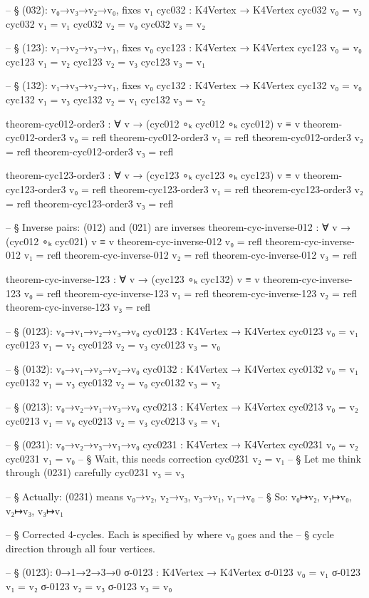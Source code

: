 \documentclass[11pt,a4paper]{book}
\begin{document}
\begin{code}
-- § (032): v₀→v₃→v₂→v₀, fixes v₁
cyc032 : K4Vertex → K4Vertex
cyc032 v₀ = v₃
cyc032 v₁ = v₁
cyc032 v₂ = v₀
cyc032 v₃ = v₂

-- § (123): v₁→v₂→v₃→v₁, fixes v₀
cyc123 : K4Vertex → K4Vertex
cyc123 v₀ = v₀
cyc123 v₁ = v₂
cyc123 v₂ = v₃
cyc123 v₃ = v₁

-- § (132): v₁→v₃→v₂→v₁, fixes v₀
cyc132 : K4Vertex → K4Vertex
cyc132 v₀ = v₀
cyc132 v₁ = v₃
cyc132 v₂ = v₁
cyc132 v₃ = v₂

theorem-cyc012-order3 : ∀ v → (cyc012 ∘ₖ cyc012 ∘ₖ cyc012) v ≡ v
theorem-cyc012-order3 v₀ = refl
theorem-cyc012-order3 v₁ = refl
theorem-cyc012-order3 v₂ = refl
theorem-cyc012-order3 v₃ = refl

theorem-cyc123-order3 : ∀ v → (cyc123 ∘ₖ cyc123 ∘ₖ cyc123) v ≡ v
theorem-cyc123-order3 v₀ = refl
theorem-cyc123-order3 v₁ = refl
theorem-cyc123-order3 v₂ = refl
theorem-cyc123-order3 v₃ = refl

-- § Inverse pairs: (012) and (021) are inverses
theorem-cyc-inverse-012 : ∀ v → (cyc012 ∘ₖ cyc021) v ≡ v
theorem-cyc-inverse-012 v₀ = refl
theorem-cyc-inverse-012 v₁ = refl
theorem-cyc-inverse-012 v₂ = refl
theorem-cyc-inverse-012 v₃ = refl

theorem-cyc-inverse-123 : ∀ v → (cyc123 ∘ₖ cyc132) v ≡ v
theorem-cyc-inverse-123 v₀ = refl
theorem-cyc-inverse-123 v₁ = refl
theorem-cyc-inverse-123 v₂ = refl
theorem-cyc-inverse-123 v₃ = refl

-- § (0123): v₀→v₁→v₂→v₃→v₀
cyc0123 : K4Vertex → K4Vertex
cyc0123 v₀ = v₁
cyc0123 v₁ = v₂
cyc0123 v₂ = v₃
cyc0123 v₃ = v₀

-- § (0132): v₀→v₁→v₃→v₂→v₀
cyc0132 : K4Vertex → K4Vertex
cyc0132 v₀ = v₁
cyc0132 v₁ = v₃
cyc0132 v₂ = v₀
cyc0132 v₃ = v₂

-- § (0213): v₀→v₂→v₁→v₃→v₀
cyc0213 : K4Vertex → K4Vertex
cyc0213 v₀ = v₂
cyc0213 v₁ = v₀
cyc0213 v₂ = v₃
cyc0213 v₃ = v₁

-- § (0231): v₀→v₂→v₃→v₁→v₀
cyc0231 : K4Vertex → K4Vertex
cyc0231 v₀ = v₂
cyc0231 v₁ = v₀
-- § Wait, this needs correction
cyc0231 v₂ = v₁
-- § Let me think through (0231) carefully
cyc0231 v₃ = v₃

-- § Actually: (0231) means v₀→v₂, v₂→v₃, v₃→v₁, v₁→v₀
-- § So: v₀↦v₂, v₁↦v₀, v₂↦v₃, v₃↦v₁

-- § Corrected 4-cycles. Each is specified by where v₀ goes and the 
-- § cycle direction through all four vertices.

-- § (0123): 0→1→2→3→0
σ-0123 : K4Vertex → K4Vertex
σ-0123 v₀ = v₁
σ-0123 v₁ = v₂
σ-0123 v₂ = v₃
σ-0123 v₃ = v₀


\end{code}
\end{document}
